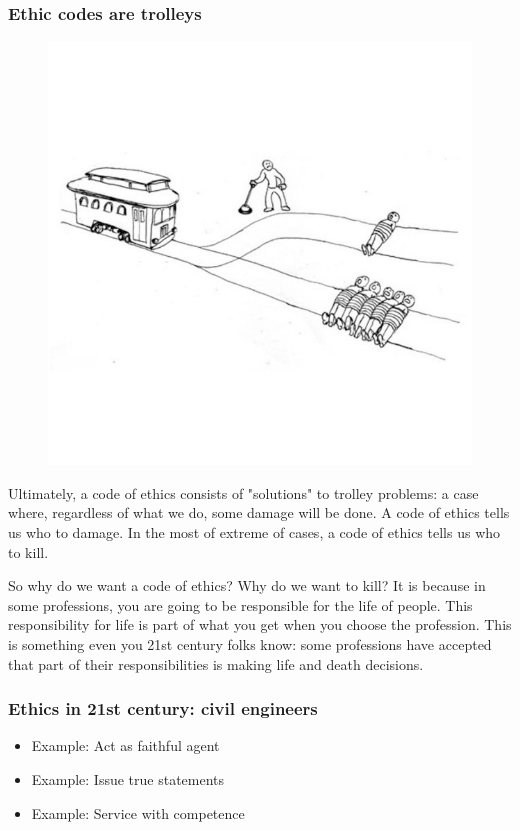 \begin{frame}[fragile]
\frametitle{Ethic codes are trolleys}

\begin{figure}
\includegraphics[scale=0.25]{trolley}
\end{figure}

\end{frame}

Ultimately, a code of ethics consists of
"solutions"
to trolley problems:
a case where,
regardless of what we do,
some damage will be done.
A code of ethics tells us who to damage.
In the most of extreme of cases,
a code of ethics tells us who to kill.

So why do we want a code of ethics?
Why do we want to kill?
It is because in some professions,
you are going to be responsible for the life of people.
This responsibility for life is part of what you get
when you choose the profession.
This is something even you 21st century folks know:
some professions have accepted that part of their responsibilities
is making life and death decisions.

\begin{frame}[fragile]
\frametitle{Ethics in 21st century: civil engineers}

\begin{itemize}
\item Example: Act as faithful agent\pause
\item Example: Issue true statements\pause
\item Example: Service with competence
\end{itemize}

\end{frame}

